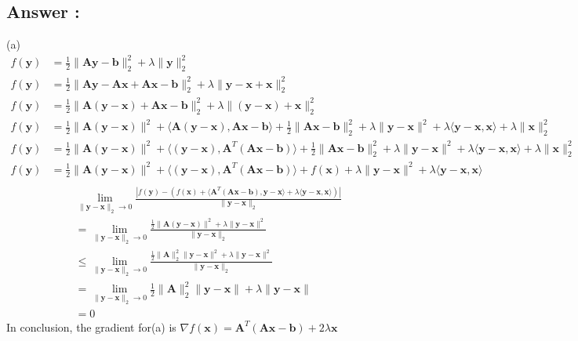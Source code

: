 \documentclass[a4paper,12pt]{article}
\begin{document}
\subsection*{Answer :}
(a)
\begin{align*}
    f(\bm{y}) &= \frac{1}{2} \|\bm{A}\bm{y} - \bm{b}\|_2^2 + \lambda\|\bm{y}\|_2^2 \\
    f(\bm{y}) &= \frac{1}{2} \|\bm{A}\bm{y} - \bm{A}\bm{x} + \bm{A}\bm{x} - \bm{b}\|_2^2 + \lambda\|\bm{y} - \bm{x} + \bm{x}\|_2^2 \\
    f(\bm{y}) &= \frac{1}{2} \|\bm{A}(\bm{y} - \bm{x}) + \bm{A}\bm{x} - \bm{b}\|_2^2 + \lambda\|(\bm{y} - \bm{x}) + \bm{x}\|_2^2 \\
    f(\bm{y}) &= \frac{1}{2} \|\bm{A}(\bm{y} - \bm{x})\|^2 + \langle \bm{A} (\bm{y} - \bm{x}), \bm{A}\bm{x} -\bm{b} \rangle+ \frac{1}{2}\|\bm{A}\bm{x} - \bm{b}\|_2^2 + \lambda\|\bm{y} - \bm{x}\|^2 + \lambda\langle \bm{y} - \bm{x}, \bm{x}\rangle + \lambda\|\bm{x}\|_2^2 \\
    f(\bm{y}) &= \frac{1}{2} \|\bm{A}(\bm{y} - \bm{x})\|^2 + \langle(\bm{y} - \bm{x}), \bm{A}^T(\bm{A}\bm{x} -\bm{b}) \rangle+ \frac{1}{2}\|\bm{A}\bm{x} - \bm{b}\|_2^2 + \lambda\|\bm{y} - \bm{x}\|^2 + \lambda\langle \bm{y} - \bm{x}, \bm{x}\rangle + \lambda\|\bm{x}\|_2^2 \\
    f(\bm{y}) &= \frac{1}{2} \|\bm{A}(\bm{y} - \bm{x})\|^2 + \langle(\bm{y} - \bm{x}), \bm{A}^T(\bm{A}\bm{x} -\bm{b}) \rangle+ f(\bm{x}) + \lambda\|\bm{y} - \bm{x}\|^2 + \lambda\langle \bm{y} - \bm{x}, \bm{x}\rangle \\
\end{align*}
\begin{align*}
    &\lim_{\|\bm{y} - \bm{x}\|_2 \to 0} \frac{ |f(\bm{y}) - (f(\bm{x}) + \langle \bm{A}^T(\bm{A}\bm{x} - \bm{b}), \bm{y} - \bm{x}\rangle + \lambda \langle \bm{y} - \bm{x}, \bm{x} \rangle)| }{\|\bm{y} - \bm{x}\|_2} \\
    &= \lim_{\|\bm{y} - \bm{x}\|_2 \to 0} \frac{\frac{1}{2} \|\bm{A}(\bm{y} - \bm{x})\|^2 + \lambda \| \bm{y} - \bm{x}\|^2}{\|\bm{y} - \bm{x}\|_2} \\
    &\leq \lim_{\|\bm{y} - \bm{x}\|_2 \to 0} \frac{\frac{1}{2} \|\bm{A}\|_2^2\|\bm{y} - \bm{x}\|^2 + \lambda \| \bm{y} - \bm{x}\|^2}{\|\bm{y} - \bm{x}\|_2} \\
    &= \lim_{\|\bm{y} - \bm{x}\|_2 \to 0} \frac{1}{2} \|\bm{A}\|_2^2\|\bm{y} - \bm{x}\| + \lambda \| \bm{y} - \bm{x}\| \\
    &= 0
\end{align*}
In conclusion, the gradient for(a) is \(\nabla f(\bm{x}) = \bm{A}^T(\bm{A}\bm{x} - \bm{b}) + 2\lambda \bm{x}\)
\end{document}
